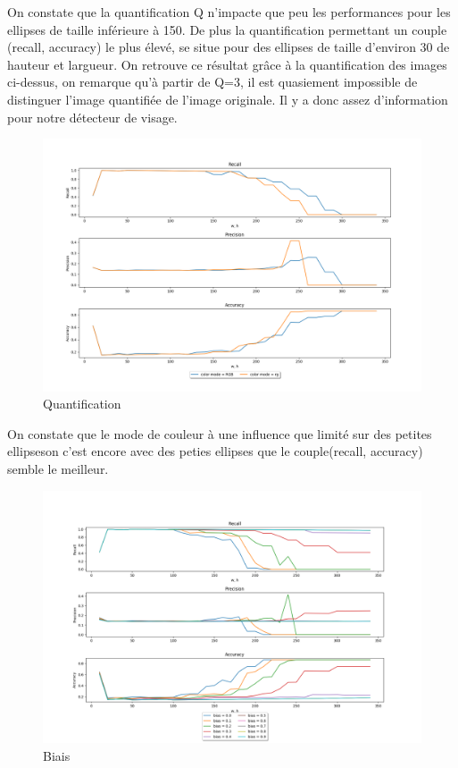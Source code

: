 \documentclass[a4paper,12pt, openany]{book}
\theoremstyle{break}
\begin{document}
On constate que la quantification Q n'impacte que peu les performances pour les ellipses de taille inférieure à 150. De plus la quantification permettant un couple (recall, accuracy) le plus élevé, se situe pour des ellipses de taille d'environ 30 de hauteur et largueur.
On retrouve ce résultat grâce à la quantification des images ci-dessus, on remarque qu'à partir de Q=3, il est quasiement impossible de distinguer l'image quantifiée de l'image originale. Il y a donc assez d'information pour notre détecteur de visage.


\begin{figure}[H]
  \includegraphics[width=\textwidth]{images/compare_color_mode}
  \caption{Quantification}
  \label{fig:colmode}
\end{figure}

On constate que le mode de couleur à une influence que limité sur des petites ellipseson c'est encore avec des peties ellipses que le couple(recall, accuracy) semble le meilleur.

\begin{figure}[H]
  \includegraphics[width=\textwidth]{images/compare_bias}
  \caption{Biais}
  \label{fig:biais}
\end{figure}
\end{document}
